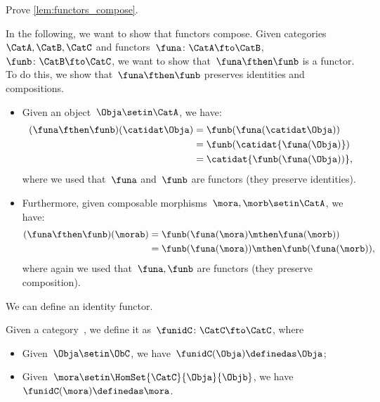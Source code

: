 \begin{exercise}
    Prove \cref{lem:functors_compose}.
\end{exercise}
\begin{solution}
    In the following, we want to show that functors compose.
    Given categories~$\CatA,\CatB,\CatC$ and functors~$\funa\colon \CatA\fto \CatB$,~$\funb \colon \CatB\fto \CatC$, we want to show that~$\funa\fthen\funb$ is a functor.
    To do this, we show that~$\funa\fthen\funb$ preserves identities and compositions.
    \begin{itemize}
        \item Given an object~$\Obja\setin \CatA$, we have:
              \begin{equation}
                  \begin{aligned}
                      (\funa\fthen\funb)(\catidat\Obja)
                       & =\funb(\funa(\catidat\Obja)) \\
                       & =\funb(\catidat{\funa(\Obja)}) \\
                       & =\catidat{\funb(\funa(\Obja))},
                  \end{aligned}
              \end{equation}
              where we used that~$\funa$ and~$\funb$ are functors (they preserve identities).
        \item Furthermore, given composable morphisms~$\mora,\morb\setin \CatA$, we have:
              \begin{equation}
                  \begin{aligned}
                      (\funa\fthen\funb)(\morab)
                       & =\funb(\funa(\mora)\mthen \funa(\morb)) \\
                       & =\funb(\funa(\mora))\mthen \funb(\funa(\morb)),
                  \end{aligned}
              \end{equation}
              where again we used that~$\funa,\funb$ are functors (they preserve composition).
    \end{itemize}
\end{solution}

We can define an identity functor.

\begin{ctdefinition}
    \label{def:identity_functor}
    Given a category~\CatC, we define it as~$\funidC\colon \CatC \fto \CatC$, where
    \begin{itemize}
        \item Given~$\Obja\setin \ObC$, we have~$\funidC(\Obja)\definedas \Obja$;
        \item Given~$\mora \setin \HomSet{\CatC}{\Obja}{\Objb}$, we have~$\funidC(\mora)\definedas \mora$.
    \end{itemize}
\end{ctdefinition}

